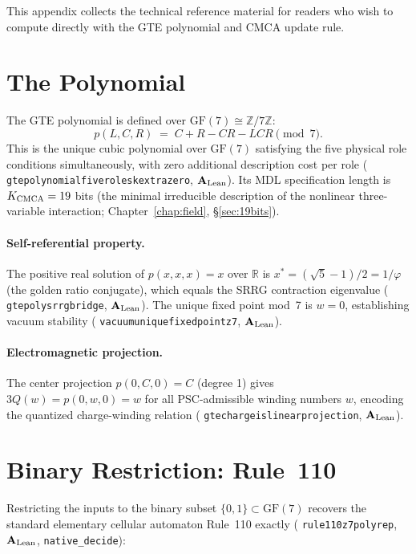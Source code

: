 \documentclass[11pt,openany]{book}
\theoremstyle{remark}
\newcommand{\lean}[1]{%
  \penalty-100
  \begingroup\def\_{\textunderscore\allowbreak}\texttt{#1}\endgroup}
\newcommand{\CatAL}{\ensuremath{\textbf{A}_{\rm Lean}}}
\begin{document}
\begin{appendices}
This appendix collects the technical reference material for readers who
wish to compute directly with the GTE polynomial and CMCA update rule.

\section*{The Polynomial}
\label{sec:appC_poly}

The GTE polynomial is defined over $\mathrm{GF}(7) \cong \mathbb{Z}/7\mathbb{Z}$:
\begin{equation}
  \label{eq:appC_poly}
  p(L, C, R) \;=\; C + R - CR - LCR \pmod{7}.
\end{equation}
This is the unique cubic polynomial over $\mathrm{GF}(7)$ satisfying the five physical
role conditions simultaneously, with zero additional description cost per role
(\lean{gte\_polynomial\_five\_roles\_k\_extra\_zero}, \CatAL).
Its MDL specification length is $K_{\rm CMCA} = 19$ bits (the minimal irreducible
description of the nonlinear three-variable interaction; Chapter~\ref{chap:field},
\S\ref{sec:19bits}).

\paragraph{Self-referential property.}
The positive real solution of $p(x,x,x) = x$ over $\mathbb{R}$ is
$x^* = (\sqrt{5}-1)/2 = 1/\varphi$ (the golden ratio conjugate), which equals
the SRRG contraction eigenvalue (\lean{gte\_poly\_srrg\_bridge}, \CatAL).
The unique fixed point mod~7 is $w = 0$, establishing vacuum stability
(\lean{vacuum\_unique\_fixed\_point\_z7}, \CatAL).

\paragraph{Electromagnetic projection.}
The center projection $p(0,C,0) = C$ (degree 1) gives
$3Q(w) = p(0,w,0) = w$ for all PSC-admissible winding numbers $w$,
encoding the quantized charge-winding relation (\lean{gte\_charge\_is\_linear\_projection}, \CatAL).

\section*{Binary Restriction: Rule~110}
\label{sec:appC_rule110}

Restricting the inputs to the binary subset $\{0,1\} \subset \mathrm{GF}(7)$
recovers the standard elementary cellular automaton Rule~110 exactly
(\lean{rule110\_z7\_poly\_rep}, \CatAL, \texttt{native\_decide}):


\end{appendices}
\end{document}
